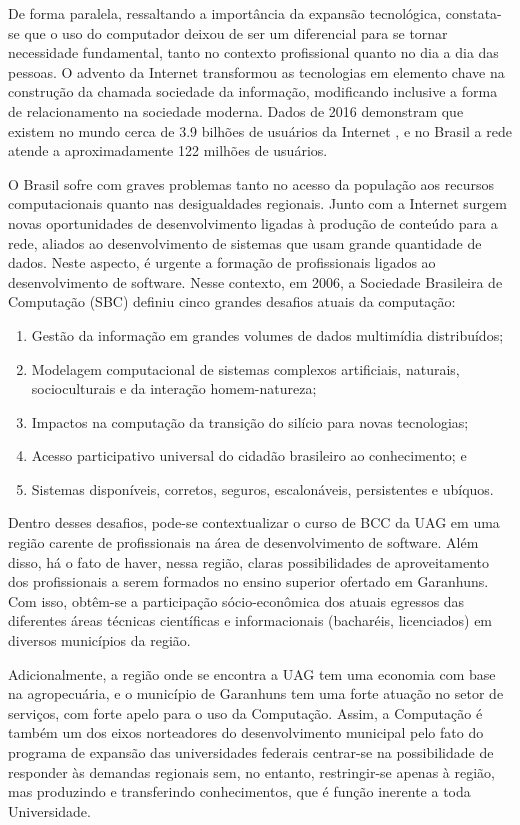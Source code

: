 \documentclass[
	12pt,				%
	openright,			%
  oneside,     %
	a4paper,			%
	chapter=TITLE,		%
	english,			%
	french,				%
	spanish,			%
	brazil				%
	]{abntex2}
\begin{document}
De forma paralela, ressaltando a importância da  expansão  tecnológica,  constata-se que o uso do computador deixou de ser um diferencial para se tornar necessidade fundamental, tanto no contexto profissional quanto no dia a dia das pessoas. O advento da Internet transformou as tecnologias em elemento chave na construção da chamada sociedade da informação, modificando inclusive a forma de relacionamento na sociedade moderna. Dados de 2016 demonstram que existem no mundo cerca de 3.9 bilhões de usuários da Internet \cite{sanou2018measuring}, e no Brasil a rede atende a aproximadamente 122 milhões de usuários.

O Brasil sofre com graves problemas tanto no acesso da população aos recursos computacionais quanto nas desigualdades regionais. Junto com a Internet surgem novas oportunidades de desenvolvimento ligadas à produção de conteúdo para a rede, aliados ao desenvolvimento de sistemas que usam grande quantidade de dados. Neste aspecto, é urgente a formação de profissionais ligados ao desenvolvimento de software. Nesse contexto, em 2006, a Sociedade Brasileira de Computação (SBC) definiu cinco grandes desafios atuais da computação:

\begin{enumerate}
    \item Gestão da informação em grandes volumes de dados multimídia distribuídos;
    \item Modelagem computacional de sistemas complexos artificiais, naturais, socioculturais e da interação homem-natureza;
    \item Impactos na computação da transição do silício para novas tecnologias;
    \item Acesso participativo universal do cidadão brasileiro ao conhecimento; e
    \item Sistemas disponíveis, corretos, seguros, escalonáveis, persistentes e ubíquos.
\end{enumerate}
	
Dentro desses desafios, pode-se contextualizar o curso de BCC da UAG em uma região carente de profissionais na área de desenvolvimento de software. Além disso, há o fato de haver, nessa região, claras possibilidades de aproveitamento dos profissionais a serem formados no ensino superior ofertado em Garanhuns. Com isso, obtêm-se a participação sócio-econômica dos atuais egressos das diferentes áreas técnicas científicas e informacionais (bacharéis, licenciados) em diversos municípios da região.

Adicionalmente, a região onde se encontra a UAG tem uma economia com base na agropecuária, e o município de Garanhuns tem uma forte atuação no setor de serviços, com forte apelo para o uso da Computação. Assim, a Computação é também um dos eixos norteadores do desenvolvimento municipal pelo fato do programa de expansão das universidades federais centrar-se na possibilidade de responder às demandas regionais sem, no entanto, restringir-se apenas à região, mas produzindo e transferindo conhecimentos, que é função inerente a toda Universidade.
\end{document}
